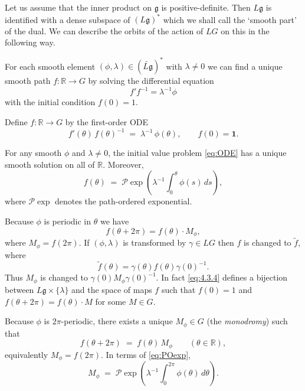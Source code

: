 \documentclass[12pt]{article}
\begin{document}
Let us assume that the inner product on $\mathfrak{g}$ is positive-definite.
Then $L\mathfrak{g}$ is identified with a dense subspace of $(L\mathfrak{g})^*$
which we shall call the ‘smooth part’ of the dual. We can describe the orbits of
the action of $LG$ on this in the following way.

For each smooth element $(\phi,\lambda) \in (\widetilde{L\mathfrak{g}})^*$
with $\lambda \neq 0$ we can find a unique smooth path $f : \mathbb{R} \to G$
by solving the differential equation
\begin{equation} \label{eq:4.3.4}
    f'f^{-1} = \lambda^{-1}\phi
\end{equation}
with the initial condition $f(0)=1$.

\begin{definition}
    Define $f:\mathbb R\to G$ by the first-order ODE
    \begin{equation}\label{eq:ODE}
        f'(\theta)\,f(\theta)^{-1} \;=\; \lambda^{-1}\,\phi(\theta),
        \qquad f(0)=\mathbf{1}.
    \end{equation}
\end{definition}

\begin{lemma}
    For any smooth $\phi$ and $\lambda\neq 0$, the initial value problem
    \eqref{eq:ODE} has a unique smooth solution on all of $\mathbb R$. Moreover,
    \begin{equation}\label{eq:POexp}
        f(\theta) \;=\; \mathcal P\exp\!\left(\lambda^{-1}
        \int_0^\theta \phi(s)\,ds\right),
    \end{equation}
    where $\mathcal P\exp$ denotes the path-ordered exponential.
\end{lemma}

Because $\phi$ is periodic in $\theta$ we have
\[
    f(\theta+2\pi) = f(\theta)\cdot M_\phi,
\]
where $M_\phi = f(2\pi)$. If $(\phi,\lambda)$ is transformed by $\gamma \in LG$
then $f$ is changed to $\tilde{f}$, where
\begin{equation} \label{eq:4.3.5}
    \tilde{f}(\theta) = \gamma(\theta) f(\theta) \gamma(0)^{-1}.
\end{equation}
Thus $M_\phi$ is changed to $\gamma(0)M_\phi \gamma(0)^{-1}$. In fact
\eqref{eq:4.3.4} defines a bijection between $L\mathfrak{g} \times \{\lambda\}$
and the space of maps $f$ such that $f(0)=1$ and
$f(\theta+2\pi)=f(\theta)\cdot M$ for some $M \in G$.

\begin{definition}
    Because $\phi$ is $2\pi$-periodic, there exists a unique $M_\phi\in G$
    (the \emph{monodromy}) such that
    \begin{equation}\label{eq:monodromy-eq}
        f(\theta+2\pi) \;=\; f(\theta)\,M_\phi \qquad (\theta\in\mathbb R),
    \end{equation}
    equivalently $M_\phi=f(2\pi)$. In terms of \eqref{eq:POexp},
    \begin{equation}\label{eq:monodromy-POexp}
        M_\phi \;=\; \mathcal P\exp\!\left(\lambda^{-1}
        \int_0^{2\pi}\phi(\theta)\,d\theta\right).
    \end{equation}
\end{definition}
\end{document}
